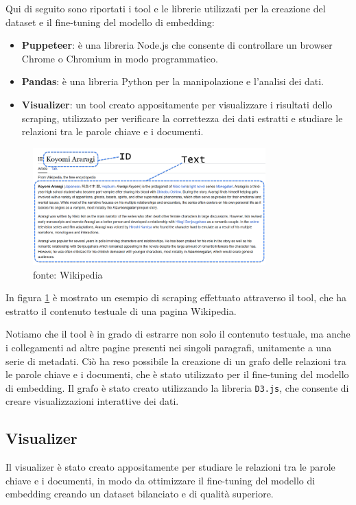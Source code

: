 Qui di seguito sono riportati i tool e le librerie
utilizzati per la creazione del dataset e il fine-tuning
del modello di embedding:

\begin{itemize}
      \item \textbf{Puppeteer}: è una libreria Node.js che consente di
            controllare un browser Chrome o Chromium in modo
            programmatico.
      \item \textbf{Pandas}: è una libreria Python per la manipolazione e
            l'analisi dei dati.
      \item \textbf{Visualizer}: un tool creato appositamente per
            visualizzare i risultati dello scraping, utilizzato per
            verificare la correttezza dei dati estratti e studiare le
            relazioni tra le parole chiave e i documenti.
\end{itemize}

\begin{figure}[H]
      \centering
      \includegraphics[width=0.8\textwidth]{res/scraper.png}
      \caption{fonte: Wikipedia}
      \label{fig:visualizer}
\end{figure}

In figura \ref{fig:visualizer} è mostrato un esempio di
scraping effettuato attraverso il tool, che ha estratto il
contenuto testuale di una pagina Wikipedia.

Notiamo che il tool è in grado di estrarre non solo il
contenuto testuale, ma anche i collegamenti ad altre pagine
presenti nei singoli paragrafi, unitamente a una serie di
metadati.
Ciò ha reso possibile la creazione di un grafo delle
relazioni tra le parole chiave e i documenti, che è stato
utilizzato per il fine-tuning del modello di embedding.
Il grafo è stato creato utilizzando la libreria
\texttt{D3.js}, che consente di creare visualizzazioni
interattive dei dati.

\subsection{Visualizer}
\label{sec:visualizer}
Il visualizer è stato creato appositamente per studiare le
relazioni tra le parole chiave e i documenti, in modo da
ottimizzare il fine-tuning del modello di embedding creando
un dataset bilanciato e di qualità superiore.

